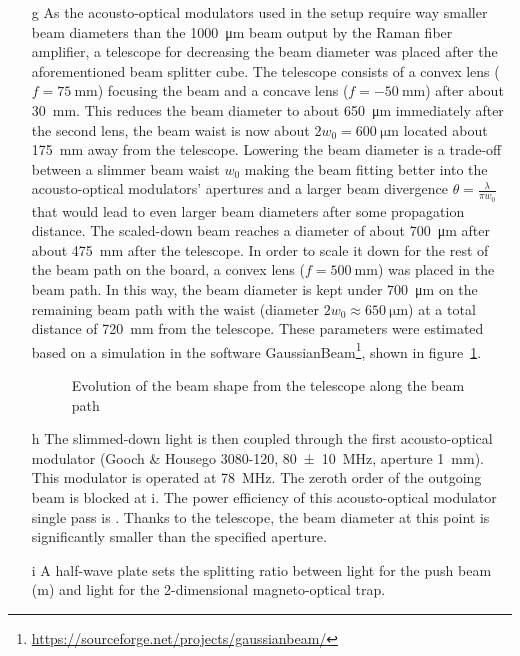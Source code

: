 \begin{itemize}
    \item[g] As the acousto-optical modulators used in the setup require way smaller beam diameters than the \SI{1000}{\micro\meter} beam output by the Raman fiber amplifier, a telescope for decreasing the beam diameter was placed after the aforementioned beam splitter cube. The telescope consists of a convex lens ($f = \SI{75}{\milli\meter}$) focusing the beam and a concave lens ($f = \SI{-50}{\milli\meter}$) after about \SI{30}{\milli\meter}. This reduces the beam diameter to about \SI{650}{\micro\meter} immediately after the second lens, the beam waist is now about $2w_0 = \SI{600}{\micro\meter}$ located about \SI{175}{\milli\meter} away from the telescope. Lowering the beam diameter is a trade-off between a slimmer beam waist $w_0$ making the beam fitting better into the acousto-optical modulators' apertures and a larger beam divergence $\theta = \frac{\lambda}{\pi w_0}$ that would lead to even larger beam diameters after some propagation distance. The scaled-down beam reaches a diameter of about \SI{700}{\micro\meter} after about \SI{475}{\milli\meter} after the telescope. In order to scale it down for the rest of the beam path on the board, a convex lens ($f = \SI{500}{\milli\meter}$) was placed in the beam path. In this way, the beam diameter is kept under \SI{700}{\micro\meter} on the remaining beam path with the waist (diameter $2w_0 \approx \SI{650}{\micro\meter}$) at a total distance of \SI{720}{\milli\meter} from the telescope.  These parameters were estimated based on a simulation in the software GaussianBeam\footnote{\url{https://sourceforge.net/projects/gaussianbeam/}}, shown in figure~\ref{fig:beam_diameter_evolution}.

\begin{figure}
    \caption{Evolution of the beam shape from the telescope along the beam path}
    \label{fig:beam_diameter_evolution}
\end{figure}

    \item[h] The slimmed-down light is then coupled through the first acousto-optical modulator (Gooch \& Housego 3080-120, \SI{80(10)}{\mega\hertz}, aperture \SI{1}{\milli\meter}). This modulator is operated at \SI{+78}{\mega\hertz}. The zeroth order of the outgoing beam is blocked at i. The power efficiency of this acousto-optical modulator single pass is . Thanks to the telescope, the beam diameter at this point is significantly smaller than the specified aperture.
    
    \item[i] A half-wave plate sets the splitting ratio between light for the push beam (m) and light for the 2-dimensional magneto-optical trap.
    

\end{itemize}
